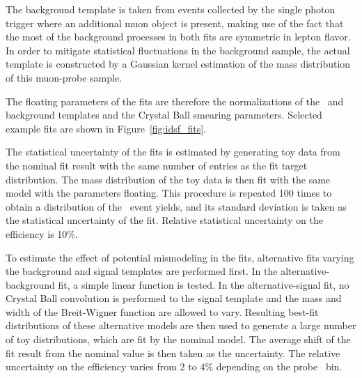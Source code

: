 The background template is taken from events collected by the single photon trigger where an additional muon object is present, making use of the fact that the most of the background processes in both fits are symmetric in lepton flavor. 
In order to mitigate statistical fluctuations in the background sample, the actual template is constructed by a Gaussian kernel estimation of the mass distribution of this muon-probe sample. %

The floating parameters of the fits are therefore the normalizations of the \Zee\ and background templates and the Crystal Ball smearing parameters. 
Selected example fits are shown in Figure~\ref{fig:idsf_fits}.

The statistical uncertainty of the fits is estimated by generating toy data from the nominal fit result with the same number of entries as the fit target distribution. 
The mass distribution of the toy data is then fit with the same model with the parameters floating. 
This procedure is repeated 100 times to obtain a distribution of the \Zee\ event yields, and its standard deviation is taken as the statistical uncertainty of the fit. 
Relative statistical uncertainty on the efficiency is 10\%. %

To estimate the effect of potential mismodeling in the fits, alternative fits varying the background and signal templates are performed first. 
In the alternative-background fit, a simple linear function is tested.
In the alternative-signal fit, no Crystal Ball convolution is performed to the signal template and the mass and width of the Breit-Wigner function are allowed to vary. 
Resulting best-fit distributions of these alternative models are then used to generate a large number of toy distributions, which are fit by the nominal model. 
The average shift of the fit result from the nominal value is then taken as the uncertainty.
The relative uncertainty on the efficiency varies from 2 to 4\% depending on the probe \pt\ bin. %

